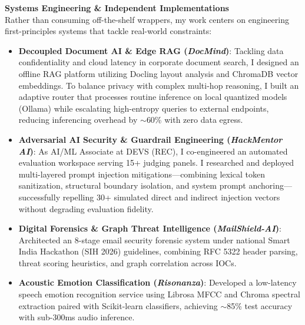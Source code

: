 \documentclass[letterpaper,10pt]{article}
\begin{document}
\vspace{2.5pt}
\noindent\textbf{Systems Engineering \& Independent Implementations} \\
Rather than consuming off-the-shelf wrappers, my work centers on engineering first-principles systems that tackle real-world constraints:
\begin{itemize}[leftmargin=0.18in, itemsep=0.5pt, topsep=0.5pt]
  \item \textbf{Decoupled Document AI \& Edge RAG (\textit{DocMind})}: Tackling data confidentiality and cloud latency in corporate document search, I designed an offline RAG platform utilizing Docling layout analysis and ChromaDB vector embeddings. To balance privacy with complex multi-hop reasoning, I built an adaptive router that processes routine inference on local quantized models (Ollama) while escalating high-entropy queries to external endpoints, reducing inferencing overhead by $\sim$60\% with zero data egress.
  \item \textbf{Adversarial AI Security \& Guardrail Engineering (\textit{HackMentor AI})}: As AI/ML Associate at DEVS (REC), I co-engineered an automated evaluation workspace serving 15+ judging panels. I researched and deployed multi-layered prompt injection mitigations—combining lexical token sanitization, structural boundary isolation, and system prompt anchoring—successfully repelling 30+ simulated direct and indirect injection vectors without degrading evaluation fidelity.
  \item \textbf{Digital Forensics \& Graph Threat Intelligence (\textit{MailShield-AI})}: Architected an 8-stage email security forensic system under national Smart India Hackathon (SIH 2026) guidelines, combining RFC 5322 header parsing, threat scoring heuristics, and graph correlation across IOCs.
  \item \textbf{Acoustic Emotion Classification (\textit{Risonanza})}: Developed a low-latency speech emotion recognition service using Librosa MFCC and Chroma spectral extraction paired with Scikit-learn classifiers, achieving $\sim$85\% test accuracy with sub-300ms audio inference.
\end{itemize}
\end{document}
